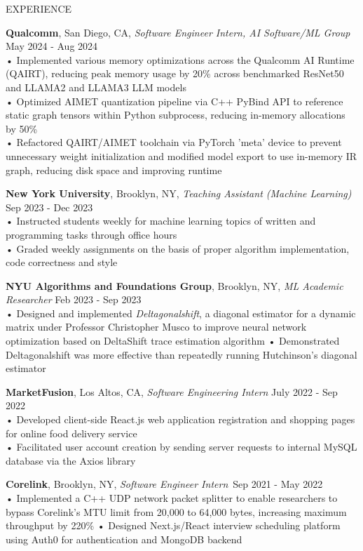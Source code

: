 \documentclass{resume} %
\begin{document}
\begin{rSection}{EXPERIENCE}

\textbf{Qualcomm}, San Diego, CA, {\emph{Software Engineer Intern, AI Software/ML Group}} \hfill May 2024 - Aug 2024 \\ 
• Implemented various memory optimizations across the Qualcomm AI Runtime (QAIRT), reducing peak memory usage by 20\% across benchmarked ResNet50 and LLAMA2 and LLAMA3 LLM models \\
• Optimized AIMET quantization pipeline via C++ PyBind API to reference static graph tensors within Python subprocess, reducing in-memory allocations by 50\% \\
• Refactored QAIRT/AIMET toolchain via PyTorch 'meta' device to prevent unnecessary weight initialization and modified model export to use in-memory IR graph, reducing disk space and improving runtime \smallskip

\textbf{New York University}, Brooklyn, NY, {\emph{Teaching Assistant (Machine Learning)}} \hfill Sep 2023 - Dec 2023 \\
• Instructed students weekly for machine learning topics of written and programming tasks through office hours \\
• Graded weekly assignments on the basis of proper algorithm implementation, code correctness and style \smallskip

\textbf {NYU Algorithms and Foundations Group}, Brooklyn, NY, {\emph{ML Academic Researcher}} \hfill Feb 2023 - Sep 2023 \\
• Designed and implemented \textit{Deltagonalshift}, a diagonal estimator for a dynamic matrix under Professor Christopher Musco to improve neural network optimization based on DeltaShift trace estimation algorithm \newline
• Demonstrated Deltagonalshift was more effective than repeatedly running Hutchinson's diagonal estimator \smallskip

\textbf{MarketFusion}, Los Altos, CA, {\emph{Software Engineering Intern}} \hfill July 2022 - Sep 2022 \\
• Developed client-side React.js web application registration and shopping pages for online food delivery service \\
• Facilitated user account creation by sending server requests to internal MySQL database via the Axios library \smallskip

\textbf{Corelink}, Brooklyn, NY, {\emph{Software Engineer Intern}}\ \hfill Sep 2021 - May 2022 \\
• Implemented a C++ UDP network packet splitter to enable researchers to bypass Corelink's MTU limit from 20,000 to 64,000 bytes, increasing maximum throughput by 220\% \newline
• Designed Next.js/React interview scheduling platform using Auth0 for authentication and MongoDB backend 


\end{rSection}
\end{document}
